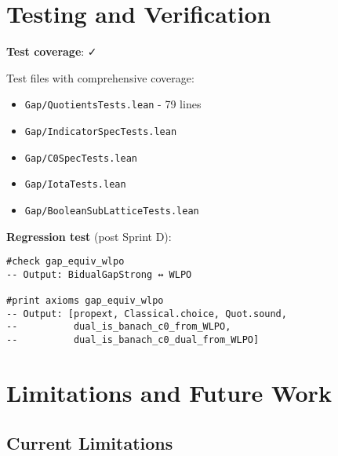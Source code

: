 \documentclass[11pt]{article}
\theoremstyle{definition}
\theoremstyle{remark}
\newcommand{\leanok}{\textcolor{green!70!black}{✓}}
\newcommand{\leanloc}[1]{\texttt{\footnotesize\color{blue!60!black}#1}}
\begin{document}
\section{Testing and Verification}\label{sec:testing}

\begin{mdframed}[style=okbox]
\textbf{Test coverage}: \leanok

Test files with comprehensive coverage:
\begin{itemize}
\item \leanloc{Gap/QuotientsTests.lean} - 79 lines
\item \leanloc{Gap/IndicatorSpecTests.lean}
\item \leanloc{Gap/C0SpecTests.lean}
\item \leanloc{Gap/IotaTests.lean}
\item \leanloc{Gap/BooleanSubLatticeTests.lean}
\end{itemize}

\textbf{Regression test} (post Sprint D):
\begin{verbatim}
#check gap_equiv_wlpo
-- Output: BidualGapStrong ↔ WLPO

#print axioms gap_equiv_wlpo  
-- Output: [propext, Classical.choice, Quot.sound,
--          dual_is_banach_c0_from_WLPO,
--          dual_is_banach_c0_dual_from_WLPO]
\end{verbatim}
\end{mdframed}

\section{Limitations and Future Work}\label{sec:limitations}

\subsection{Current Limitations}
\end{document}
